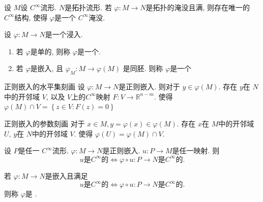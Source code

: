 \documentclass[../main.tex]{subfiles}
\begin{document}
\begin{theorem}{}{}
   设 \(  M  \)设 \(  C^{\infty}  \)流形. \(  N  \)是拓扑流形. 若 \(   \varphi: M\to N  \)是拓扑的淹没且满, 则存在唯一的 \(  C^{\infty}  \)结构, 使得 \(   \varphi  \)是一个 \(  C^{\infty}  \)淹没.  
\end{theorem}

\begin{definition}{}{}
  设 \(   \varphi   :M\to N\)是一个浸入. 
  \begin{enumerate}
    \item 若 \(   \varphi   \)是单的, 则称 \(   \varphi   \)是一个. 
    \item 若 \(   \varphi   \)是嵌入, 且 \(   \varphi _{M}: M\to  \varphi \left( M \right)   \)    是同胚. 则称 \(   \varphi   \)是一个 
  \end{enumerate}
   
\end{definition}

\begin{theorem}{正则嵌入的水平集刻画}{}
  设 \(   \varphi :M\to N  \)是正则嵌入. 则对于 \(  y \in  \varphi \left( M \right)   \). 存在 \(  y  \)在 \(  N  \)中的开邻域 \(  V  \), 以及 \(  V  \)上的\(  C^{\infty}  \)映射 \(  F: V\to \mathbb{R}   ^{n-m}\). 使得  \(   \varphi \left( M \right)\cap V= \left\{ z\in V: F\left( z \right)= 0  \right\}   \)          
\end{theorem}

\begin{theorem}{正则嵌入的参数刻画}{}
  对于 \(  x \in M , y =  \varphi \left( x \right)\in  \varphi \left( M \right)   \). 存在 \(  x  \)在 \(  M  \)中的开邻域 \(  U  \), \(  y  \)在 \(  N  \)中的开邻域 \(  V  \). 使得 \(   \varphi \left( U \right)=  \varphi \left( M \right)\cap V    \).         
\end{theorem}

\begin{theorem}{}{}
  设 \(  P  \)是任一 \(  C^{\infty}  \)流形.  \(   \varphi :M\to N  \)是正则嵌入.   \(  u: P\to M  \)是任一映射. 则 \[
 u \text{是} C^{\infty}\text{的} \iff   \varphi \circ u:P\to N \text{是} C^{\infty} \text{的}. 
  \]   
\end{theorem}

\begin{definition}{}{}
  若 \(   \varphi :M\to N  \)是嵌入且满足\[
 u \text{是} C^{\infty}\text{的} \iff   \varphi \circ u:P\to N \text{是} C^{\infty} \text{的}. 
  \]    则称 \(   \varphi   \)是 .   
\end{definition}
\end{document}
